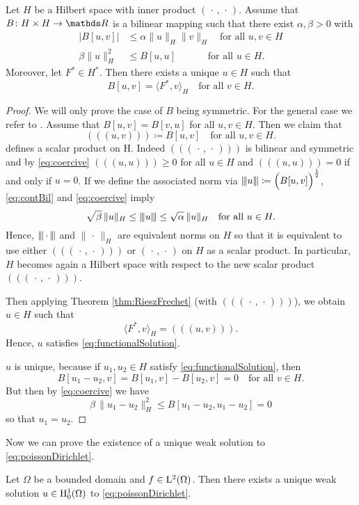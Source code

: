 \begin{thm}
  Let $H$ be a Hilbert space with inner product $(\,\cdot\, , \,\cdot\,)$.
  Assume that $B \colon H \times H \to \R$ is a bilinear mapping such that there exist $\alpha, \beta > 0$ with 
  \begin{align}
    \label{eq:contBil}
    |B[u,v]| &\leq \alpha \|u\|_H \|v\|_H \quad\text{for all } u, v \in H \\
    \label{eq:coercive}
    \beta \|u\|_H^2 &\leq B[u,u] \;\quad\quad\quad\text{for all } u \in H.
  \end{align}
  Moreover, let $F^* \in H^*$.
  Then there exists a unique $u \in H$ such that
  \begin{equation}
    \label{eq:functionalSolution}
    B[u,v] = \langle F^*, v \rangle_H \quad \text{for all } v \in H.
  \end{equation}
\end{thm}

\begin{proof}
  We will only prove the case of $B$ being symmetric.
  For the general case we refer to \cite[Theorem 1 in Section 6.2.1]{evans2010partial}.
  Assume that $B[u,v] = B[v,u]$ for all $u,v \in H$.
  Then we claim that
  $$
  (\!(\!( u, v )\!)\!) \coloneqq B[u,v] \quad\text{for all } u,v \in H.
  $$
  defines a scalar product on H.
  Indeed $(\!(\!(\,\cdot\, , \,\cdot\, )\!)\!)$ is bilinear and symmetric and by \eqref{eq:coercive} $(\!(\!(u,u )\!)\!) \geq 0$ for all $u \in H$ and $(\!(\!( u,u )\!)\!) = 0$ if and only if $u = 0$.
  If we define the associated norm via ${\left\vert\kern-0.25ex\left\vert\kern-0.25ex\left\vert u \right\vert\kern-0.25ex\right\vert\kern-0.25ex\right\vert} \coloneqq \Big( B[u,v] \Big)^{\frac{1}{2}}$, \eqref{eq:contBil} and \eqref{eq:coercive} imply
  $$
  \sqrt{\beta} \, \|u\|_H \leq {\left\vert\kern-0.25ex\left\vert\kern-0.25ex\left\vert u \right\vert\kern-0.25ex\right\vert\kern-0.25ex\right\vert} \leq \sqrt{\alpha} \, \|u\|_H \quad\text{for all } u \in H.
  $$
  Hence, ${\left\vert\kern-0.25ex\left\vert\kern-0.25ex\left\vert  \,\cdot\, \right\vert\kern-0.25ex\right\vert\kern-0.25ex\right\vert}$ and $\|\,\cdot\,\|_H$ are equivalent norms on $H$ so that it is equivalent to use either $(\!(\!( \,\cdot\, , \,\cdot\, )\!)\!)$ or $(\,\cdot\, , \,\cdot\,)$ on $H$ as a scalar product. In particular, $H$ becomes again a Hilbert space with respect to the new scalar product $(\!(\!( \,\cdot\, , \,\cdot\, )\!)\!)$.

  Then applying Theorem \ref{thm:RieszFrechet} (with $(\!(\!( \,\cdot\, , \,\cdot\, )\!)\!)$), we obtain $u \in H$ such that
  $$
  \langle F^* , v \rangle_H = (\!(\!( u , v )\!)\!).
  $$
  Hence, $u$ satisfies \eqref{eq:functionalSolution}.

  $u$ is unique, because if $u_1, u_2 \in H$ satisfy \eqref{eq:functionalSolution}, then
  $$
  B[u_1 - u_2, v] = B[u_1, v] - B[u_2, v] = 0 \quad\text{for all } v \in H.
  $$
  But then by \eqref{eq:coercive} we have
  $$
  \beta \, \|u_1 - u_2\|_H^2 \leq B[u_1 - u_2, u_1 - u_2] = 0
  $$
  so that $u_1 = u_2$.
\end{proof}

Now we can prove the existence of a unique weak solution to \eqref{eq:poissonDirichlet}.

\begin{thm}
  Let $\Omega$ be a bounded domain and $f \in \mathrm{L}^2(\Omega)$.
  Then there exists a unique weak solution $u \in \mathrm{H}_0^1(\Omega)$ to \eqref{eq:poissonDirichlet}.
\end{thm}

